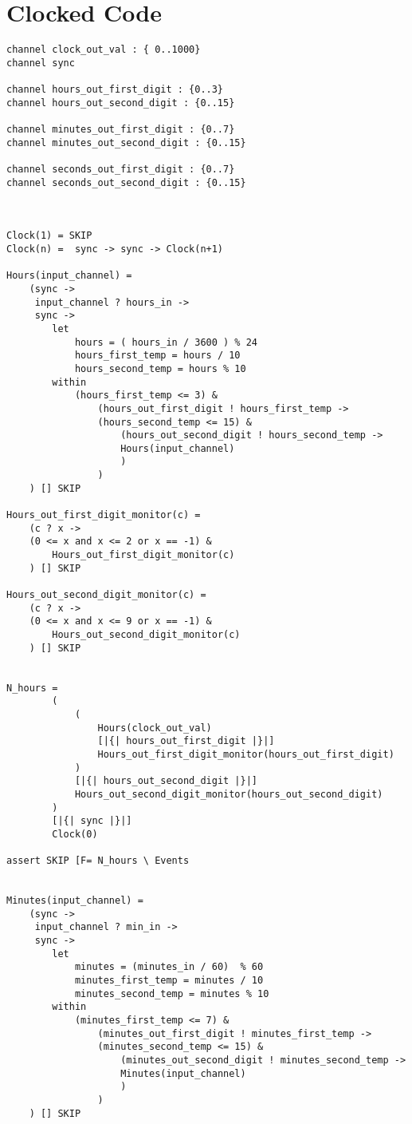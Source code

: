 \section*{Clocked \cspm{} Code}
\begin{verbatim}
channel clock_out_val : { 0..1000}
channel sync

channel hours_out_first_digit : {0..3}
channel hours_out_second_digit : {0..15}

channel minutes_out_first_digit : {0..7}
channel minutes_out_second_digit : {0..15}

channel seconds_out_first_digit : {0..7}
channel seconds_out_second_digit : {0..15}



Clock(1) = SKIP
Clock(n) =  sync -> sync -> Clock(n+1)

Hours(input_channel) =
    (sync ->
     input_channel ? hours_in ->
     sync ->
        let
            hours = ( hours_in / 3600 ) % 24
            hours_first_temp = hours / 10
            hours_second_temp = hours % 10
        within
            (hours_first_temp <= 3) &
                (hours_out_first_digit ! hours_first_temp ->
                (hours_second_temp <= 15) &
                    (hours_out_second_digit ! hours_second_temp ->
                    Hours(input_channel)
                    )
                )
    ) [] SKIP

Hours_out_first_digit_monitor(c) =
    (c ? x ->
    (0 <= x and x <= 2 or x == -1) &
        Hours_out_first_digit_monitor(c)
    ) [] SKIP

Hours_out_second_digit_monitor(c) =
    (c ? x ->
    (0 <= x and x <= 9 or x == -1) &
        Hours_out_second_digit_monitor(c)
    ) [] SKIP


N_hours =
        (
            (
                Hours(clock_out_val)
                [|{| hours_out_first_digit |}|]
                Hours_out_first_digit_monitor(hours_out_first_digit)
            )
            [|{| hours_out_second_digit |}|]
            Hours_out_second_digit_monitor(hours_out_second_digit)
        )
        [|{| sync |}|]
        Clock(0)

assert SKIP [F= N_hours \ Events


Minutes(input_channel) =
    (sync ->
     input_channel ? min_in ->
     sync ->
        let
            minutes = (minutes_in / 60)  % 60
            minutes_first_temp = minutes / 10
            minutes_second_temp = minutes % 10
        within
            (minutes_first_temp <= 7) &
                (minutes_out_first_digit ! minutes_first_temp ->
                (minutes_second_temp <= 15) &
                    (minutes_out_second_digit ! minutes_second_temp ->
                    Minutes(input_channel)
                    )
                )
    ) [] SKIP


\end{verbatim}
